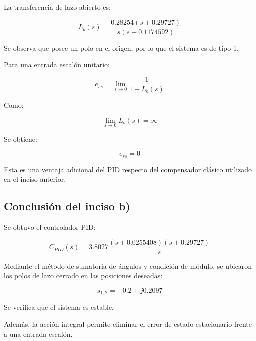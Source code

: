 \documentclass[10pt]{article}
\begin{document}
La transferencia de lazo abierto es:

\[
L_b(s)=
\frac{
0.28254(s+0.29727)
}{
s(s+0.1174592)
}
\]

Se observa que posee un polo en
el origen, por lo que el sistema
es de tipo 1.

Para una entrada escalón unitario:

\[
e_{ss}=
\lim_{s\to0}
\frac{1}{1+L_b(s)}
\]

Como:

\[
\lim_{s\to0}L_b(s)=\infty
\]

Se obtiene:

\begin{equation}
\boxed{e_{ss}=0}
\end{equation}

Esta es una ventaja adicional del
PID respecto del compensador clásico
utilizado en el inciso anterior.

\subsection*{Conclusión del inciso b)}

Se obtuvo el controlador PID:

\[
\boxed{
C_{PID}(s)=
3.8027
\frac{
(s+0.0255408)(s+0.29727)
}{s}
}
\]

Mediante el método de sumatoria
de ángulos y condición de módulo,
se ubicaron los polos de lazo cerrado
en las posiciones deseadas:

\[
\boxed{s_{1,2}=-0.2\pm j0.2097}
\]

Se verifica que el sistema es estable.

Además, la acción integral permite
eliminar el error de estado estacionario
frente a una entrada escalón.
\end{document}
